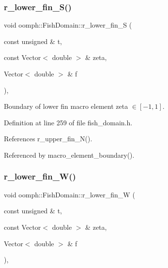 \subsubsection{\texorpdfstring{r\+\_\+lower\+\_\+fin\+\_\+\+S()}{r\_lower\_fin\_S()}}
{\footnotesize\ttfamily void oomph\+::\+Fish\+Domain\+::r\+\_\+lower\+\_\+fin\+\_\+S (\begin{DoxyParamCaption}\item[{const unsigned \&}]{t,  }\item[{const Vector$<$ double $>$ \&}]{zeta,  }\item[{Vector$<$ double $>$ \&}]{f }\end{DoxyParamCaption})\hspace{0.3cm}{\ttfamily [inline]}, {\ttfamily [private]}}



Boundary of lower fin macro element zeta $ \in [-1,1] $. 



Definition at line 259 of file fish\+\_\+domain.\+h.



References r\+\_\+upper\+\_\+fin\+\_\+\+N().



Referenced by macro\+\_\+element\+\_\+boundary().

\mbox{\label{classoomph_1_1FishDomain_aaf5f3eb1842dc9d7e3f51d4b727632f9}} 
\subsubsection{\texorpdfstring{r\+\_\+lower\+\_\+fin\+\_\+\+W()}{r\_lower\_fin\_W()}}
{\footnotesize\ttfamily void oomph\+::\+Fish\+Domain\+::r\+\_\+lower\+\_\+fin\+\_\+W (\begin{DoxyParamCaption}\item[{const unsigned \&}]{t,  }\item[{const Vector$<$ double $>$ \&}]{zeta,  }\item[{Vector$<$ double $>$ \&}]{f }\end{DoxyParamCaption})\hspace{0.3cm}{\ttfamily [inline]}, {\ttfamily [private]}}



